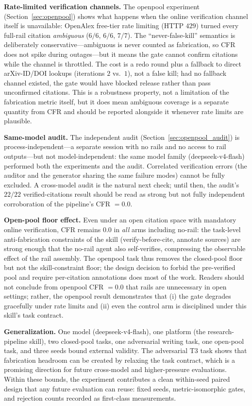 \documentclass[10pt,twocolumn]{article}
\begin{document}
\textbf{Rate-limited verification channels.} The openpool experiment (Section~\ref{sec:openpool}) shows what happens when the online verification channel itself is unavailable: OpenAlex free-tier rate limiting (HTTP $429$) turned every full-rail citation \emph{ambiguous} ($6/6$, $6/6$, $7/7$). The ``never-false-kill'' semantics is deliberately conservative---ambiguous is never counted as fabrication, so CFR does not spike during outages---but it means the gate cannot confirm citations while the channel is throttled. The cost is a redo round plus a fallback to direct arXiv-ID/DOI lookups (iterations $2$ vs.\ $1$), not a false kill; had no fallback channel existed, the gate would have blocked release rather than pass unconfirmed citations. This is a robustness property, not a limitation of the fabrication metric itself, but it does mean ambiguous coverage is a separate quantity from CFR and should be reported alongside it whenever rate limits are plausible.

\textbf{Same-model audit.} The independent audit (Section~\ref{sec:openpool_audit}) is process-independent---a separate session with no rails and no access to rail outputs---but not model-independent: the same model family (deepseek-v4-flash) performed both the experiments and the audit. Correlated verification errors (the auditor and the generator sharing the same failure modes) cannot be fully excluded. A cross-model audit is the natural next check; until then, the audit's $22/22$ verified-citations result should be read as strong but not fully independent corroboration of the pipeline's CFR $= 0.0$.

\textbf{Open-pool floor effect.} Even under an open citation space with mandatory online verification, CFR remains $0.0$ in \emph{all} arms including no-rail: the task-level anti-fabrication constraints of the skill (verify-before-cite, annotate sources) are strong enough that the no-rail agent also self-verifies, compressing the observable effect of the rail assembly. The openpool task thus removes the closed-pool floor but not the skill-constraint floor; the design decision to forbid the pre-verified pool and require per-citation annotations does most of the work. Readers should not conclude from openpool CFR $= 0.0$ that rails are unnecessary in open settings; rather, the openpool result demonstrates that (i) the gate degrades gracefully under rate limits and (ii) even the control arm is disciplined under this skill's task contract.

\textbf{Generalization.} One model (deepseek-v4-flash), one platform (the research-pipeline skill), two closed-pool tasks, one adversarial writing task, one open-pool task, and three seeds bound external validity. The adversarial T3 task shows that fabrication headroom can be created by relaxing the task contract, which is a promising direction for future cross-model and higher-pressure evaluations. Within these bounds, the experiment contributes a clean within-seed paired design that any future evaluation can reuse: fixed seeds, metric-isomorphic gates, and rejection counts recorded as first-class measurements.
\end{document}
